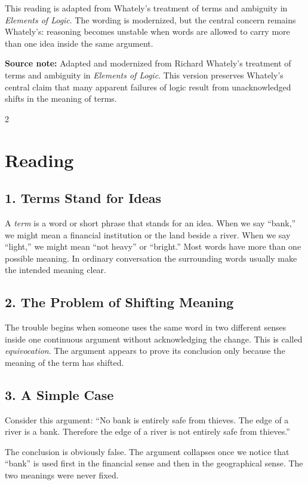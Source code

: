 \documentclass[12pt]{article}
\newcommand{\focusbox}[1]{%
\vspace{0.4em}\noindent\colorbox{gray!12}{\begin{minipage}{0.96\linewidth}#1\end{minipage}}\vspace{0.5em}}
\begin{document}
This reading is adapted from Whately's treatment of terms and ambiguity in \textit{Elements of Logic}. The wording is modernized, but the central concern remains Whately's: reasoning becomes unstable when words are allowed to carry more than one idea inside the same argument.

\focusbox{\textbf{Source note:} Adapted and modernized from Richard Whately's treatment of terms and ambiguity in \textit{Elements of Logic}. This version preserves Whately's central claim that many apparent failures of logic result from unacknowledged shifts in the meaning of terms.}

\begin{multicols}{2}
\section*{Reading}

\subsection*{1. Terms Stand for Ideas}
A \textit{term} is a word or short phrase that stands for an idea. When we say “bank,” we might mean a financial institution or the land beside a river. When we say “light,” we might mean “not heavy” or “bright.” Most words have more than one possible meaning. In ordinary conversation the surrounding words usually make the intended meaning clear.

\subsection*{2. The Problem of Shifting Meaning}
The trouble begins when someone uses the same word in two different senses inside one continuous argument without acknowledging the change. This is called \textit{equivocation}. The argument appears to prove its conclusion only because the meaning of the term has shifted.

\subsection*{3. A Simple Case}
Consider this argument: “No bank is entirely safe from thieves. The edge of a river is a bank. Therefore the edge of a river is not entirely safe from thieves.”

The conclusion is obviously false. The argument collapses once we notice that “bank” is used first in the financial sense and then in the geographical sense. The two meanings were never fixed.


\end{multicols}
\end{document}
